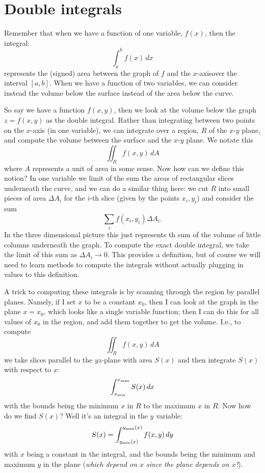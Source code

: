 \section{Double integrals}

Remember that when we have a function of one variable, $f(x)$, then the integral:
\[ \int_a^b f(x)\,dx \]
represents the (signed) area between the graph of $f$ and the $x$-axisover the interval $[a,b]$. When we have a function of two variables, we can consider instead the volume below the surface instead of the area below the curve.

So say we have a function $f(x,y)$, then we look at the volume below the graph $z=f(x,y)$ as the double integral. Rather than integrating between two points on the $x$-axis (in one variable), we can integrate over a region, $R$ of the $x$-$y$ plane, and compute the volume between the surface and the $x$-$y$ plane. We notate this
\[ \iint_R f(x,y)\,dA \]
where $A$ represents a unit of area in some sense. Now how can we define this notion? In one variable we limit of the sum the areas of rectangular slices underneath the curve, and we can do a similar thing here: we cut $R$ into small pieces of area $\Delta A_i$ for the $i$-th slice (given by the points $x_i,y_i$) and consider the sum
\[ \sum_i f(x_i,y_i)\Delta A_i. \]
In the three dimensional picture this just represents th  sum of the volume of little columns underneath the graph. To compute the exact double integral, we take the limit of this sum as $\Delta A_i \to 0$. This provides a definition, but of course we will need to learn methods to compute the integrals without actually plugging in values to this definition.

A trick to computing these integrals is by scanning through the region by parallel planes. Namely, if I set $x$ to be a constant $x_0$, then I can look at the graph in the plane $x = x_0$, which looks like a single variable function; then I can do this for all values of $x_0$ in the region, and add them together to get the volume. I.e., to compute 
\[ \iint_R f(x,y)\,dA \]
we take slices parallel to the $yz$-plane with area $S(x)$ and then integrate $S(x)$ with respect to $x$:
\[ \int_{x_{\mathrm{min}}}^{x_{\mathrm{max}}} S(x) \,dx \]
with the bounds being the minimum $x$ in $R$ to the maximum $x$ in $R$. Now how do we find $S(x)$? Well it's an integral in the $y$ variable: 
\[ S(x) = \int_{y_{\mathrm{min}}(x)}^{y_{\mathrm{max}}(x)} f(x,y)\, dy \]
with $x$ being a constant in the integral, and the bounds being the minimum and maximum $y$ in the plane (\textit{which depend on $x$ since the plane depends on $x$!}).

